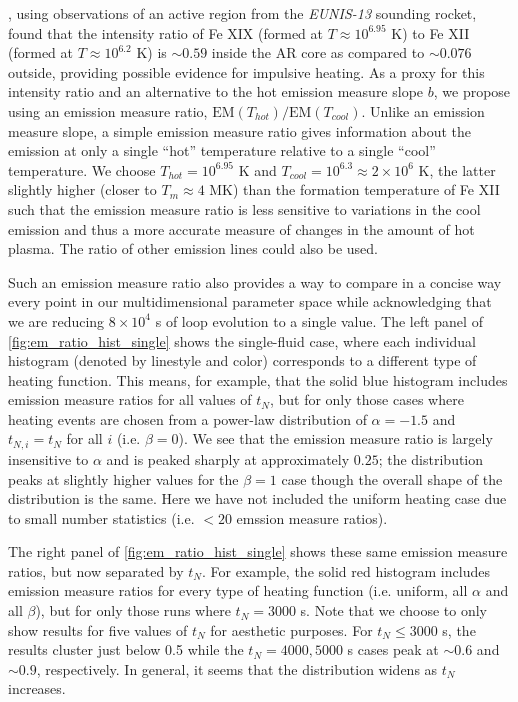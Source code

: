 \documentclass[preprint,linenumbers]{aastex}
\begin{document}
	\par\citet{brosius_pervasive_2014}, using observations of an active region from the \textit{EUNIS-13} sounding rocket, found that the intensity ratio of Fe XIX (formed at $T\approx10^{6.95}$ K) to Fe XII (formed at $T\approx10^{6.2}$ K) is $\sim0.59$ inside the AR core as compared to $\sim0.076$ outside, providing possible evidence for impulsive heating. As a proxy for this intensity ratio and an alternative to the hot emission measure slope $b$, we propose using an emission measure ratio, $\mathrm{EM}(T_{hot})/\mathrm{EM}(T_{cool})$. Unlike an emission measure slope, a simple emission measure ratio gives information about the emission at only a single ``hot'' temperature relative to a single ``cool'' temperature. We choose $T_{hot}=10^{6.95}$ K and $T_{cool}=10^{6.3}\approx2\times10^6$ K, the latter slightly higher (closer to $T_{m}\approx4$ MK) than the formation temperature of Fe XII such that the emission measure ratio is less sensitive to variations in the cool emission and thus a more accurate measure of changes in the amount of hot plasma. The ratio of other emission lines could also be used. 
	\par Such an emission measure ratio also provides a way to compare in a concise way every point in our multidimensional parameter space while acknowledging that we are reducing $8\times10^4$ s of loop evolution to a single value. The left panel of \autoref{fig:em_ratio_hist_single} shows the single-fluid case, where each individual histogram (denoted by linestyle and color) corresponds to a different type of heating function. This means, for example, that the solid blue histogram includes emission measure ratios for all values of $t_N$, but for only those cases where heating events are chosen from a power-law distribution of $\alpha=-1.5$ and $t_{N,i}=t_N$ for all $i$ (i.e. $\beta=0$). We see that the emission measure ratio is largely insensitive to $\alpha$ and is peaked sharply at approximately $0.25$; the distribution peaks at slightly higher values for the $\beta=1$ case though the overall shape of the distribution is the same. Here we have not included the uniform heating case due to small number statistics (i.e. $<20$ emssion measure ratios). 
	\par The right panel of \autoref{fig:em_ratio_hist_single} shows these same emission measure ratios, but now separated by $t_N$. For example, the solid red histogram includes emission measure ratios for every type of heating function (i.e. uniform, all $\alpha$ and all $\beta$), but for only those runs where $t_N=3000$ s. Note that we choose to only show results for five values of $t_N$ for aesthetic purposes. For $t_N\le3000$ s, the results cluster just below 0.5 while the $t_N=4000,5000$ s cases peak at $\sim0.6$ and $\sim0.9$, respectively. In general, it seems that the distribution widens as $t_N$ increases.
\end{document}
